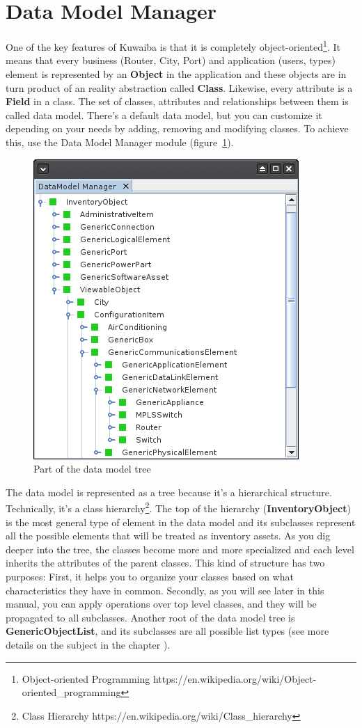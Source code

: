 \documentclass[a4paper]{article}
\begin{document}
	\section{Data Model Manager}
		One of the key features of Kuwaiba is that it is completely object-oriented\footnote{Object-oriented Programming https://en.wikipedia.org/wiki/Object-oriented\_programming}. It means that every business (Router, City, Port) and application (users, types) element is represented by an \textbf{Object} in the application and these objects are in turn product of an reality abstraction called \textbf{Class}. Likewise, every attribute is a \textbf{Field} in a class. The set of classes, attributes and relationships between them is called data model. There's a default data model, but you can customize it depending on your needs by adding, removing and modifying classes. To achieve this, use the Data Model Manager module (figure~\ref{fig:data_model_manager}).
		\begin{figure}[h!]
			\centering
			\includegraphics[width=0.4\linewidth]{img/data_model_manager.png}
			\caption{Part of the data model tree}
			\label{fig:data_model_manager}
		\end{figure}
		The data model is represented as a tree because it's a hierarchical structure. Technically, it's a class hierarchy\footnote{Class Hierarchy https://en.wikipedia.org/wiki/Class\_hierarchy}. The top of the hierarchy (\textbf{InventoryObject}) is the most general type of element in the data model and its subclasses represent all the possible elements that will be treated as inventory assets. As you dig deeper into the tree, the classes become more and more specialized and each level inherits the attributes of the parent classes. This kind of structure has two purposes: First, it helps you to organize your classes based on what characteristics they have in common. Secondly, as you will see later in this manual, you can apply operations over top level classes, and they will be propagated to all subclasses. Another root of the data model tree is \textbf{GenericObjectList}, and its subclasses are all possible list types (see more details on the subject in the chapter \textbf{}).\newline
		
\end{document}
